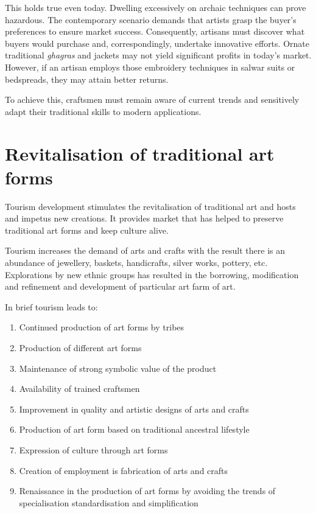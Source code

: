 This holds true even today. Dwelling excessively on archaic techniques can prove hazardous. The contemporary scenario demands that artists grasp the buyer's preferences to ensure market success. Consequently, artisans must discover what buyers would purchase and, correspondingly, undertake innovative efforts. Ornate traditional \emph{ghagras} and jackets may not yield significant profits in today's market. However, if an artisan employs those embroidery techniques in salwar suits or bedspreads, they may attain better returns.

To achieve this, craftsmen must remain aware of current trends and sensitively adapt their traditional skills to modern applications.


\section{Revitalisation of traditional art forms} %
\label{sec:rev}

Tourism development stimulates the revitalisation of traditional art and hosts and impetus new creations. It provides market that has helped to preserve traditional art forms and keep culture alive.

Tourism increases the demand of arts and crafts with the result there is an abundance of jewellery, baskets, handicrafts, silver works, pottery, etc. Explorations by new ethnic groups has resulted in the borrowing, modification and refinement and development of particular art farm of art.

In brief tourism leads to:

\begin{enumerate}
  \item Continued production of art forms by tribes
  \item Production of different art forms
  \item Maintenance of strong symbolic value of the product
  \item Availability of trained craftsmen
  \item Improvement in quality and artistic designs of arts and crafts
  \item Production of art form based on traditional ancestral lifestyle
  \item Expression of culture through art forms
  \item Creation of employment is fabrication of arts and crafts
  \item Renaissance in the production of art forms by avoiding the trends of specialisation standardisation and simplification
\end{enumerate}


